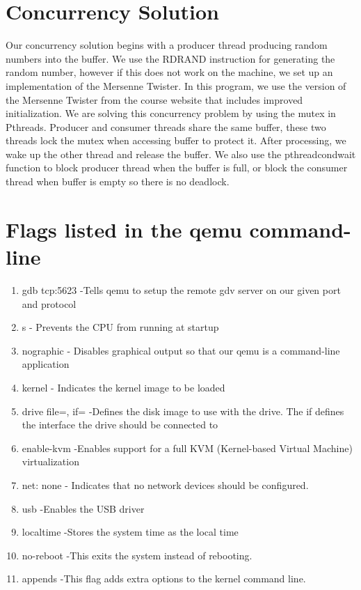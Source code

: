 \documentclass[letterpaper,10pt,draftclsnofoot,onecolumn]{IEEEtran}
\begin{document}
\begin{flushleft}
\section{Concurrency Solution} 
Our concurrency solution begins with a producer thread producing random numbers into the buffer. We use the RDRAND instruction for generating the random number, however if this does not work on the machine, we set up an implementation of the Mersenne Twister. In this program, we use the version of the Mersenne Twister from the course website that includes improved initialization. We are solving this concurrency problem by using the mutex in Pthreads. Producer and consumer threads share the same buffer, these two threads lock the mutex when accessing buffer to protect it. After processing, we wake up the other thread and release the buffer. We also use the pthreadcondwait function to block producer thread when the buffer is full, or block the consumer thread when buffer is empty so there is no deadlock.

\section{Flags listed in the qemu command-line}
\begin{enumerate}
	\item gdb tcp:5623 -Tells qemu to setup the remote gdv server on our given port and protocol
	\item s  - Prevents the CPU from running at startup
	\item nographic - Disables graphical output so that our qemu is a command-line application
	\item kernel - Indicates the kernel image to be loaded
	\item drive file=, if= -Defines the disk image to use with the drive. The if defines the interface the drive should be connected to
	\item enable-kvm -Enables support for a full KVM (Kernel-based Virtual Machine) virtualization
	\item net: none - Indicates that no network devices should be configured.
	\item usb -Enables the USB driver
	\item localtime -Stores the system time as the local time
	\item no-reboot -This exits the system instead of rebooting.
	\item appends -This flag adds extra options to the kernel command line.
\end{enumerate}


\end{flushleft}
\end{document}

